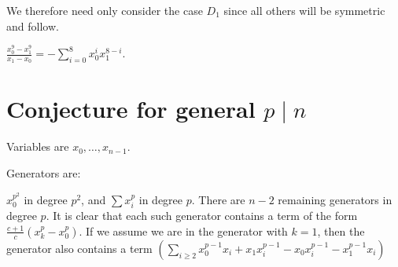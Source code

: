 \documentclass{article}
\numberwithin{equation}{section}
\begin{document}
We therefore need only consider the case $D_1$ since all others will be symmetric and follow.

$\frac{x_0^9-x_1^9}{x_1-x_0}=-\sum_{i=0}^8 x_0^ix_1^{8-i}$.


\section{Conjecture for general $p \mid n$}

Variables are $x_0,\dots,x_{n-1}$.

Generators are:

$x_0^{p^2}$ in degree $p^2$, and $\sum x_i^p$ in degree $p$. There are $n-2$ remaining generators in degree $p$. It is clear that each such generator contains a term of the form $\frac{c+1}{c}(x_k^p-x_0^p)$. If we assume we are in the generator with $k=1$, then the generator also contains a term $\left(\sum_{i \ge 2} x_0^{p-1}x_i+x_1x_i^{p-1}-x_0x_i^{p-1}-x_1^{p-1}x_i\right)$
\end{document}
